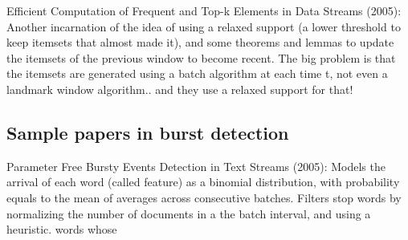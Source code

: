 \documentclass[11pt]{llncs} %
\begin{document}
Efficient Computation of Frequent and Top-k Elements in Data Streams (2005): 
Another incarnation of the idea of using a relaxed support (a lower threshold to keep itemsets that almost made it), and some theorems and lemmas to update the itemsets of the previous window to become recent. The big problem is that the itemsets are generated using a batch algorithm at each time t, not even a landmark window algorithm.. and they use a relaxed support for that!

\subsection{Sample papers in burst detection}
Parameter Free Bursty Events Detection in Text Streams (2005): 
Models the arrival of each word (called feature) as a binomial distribution, with probability equals to the mean of averages across consecutive batches. Filters stop words by normalizing the number of documents in a the batch interval, and using a heuristic.  words whose
\end{document}
